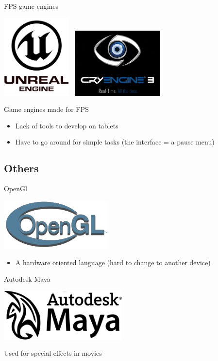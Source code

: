\documentclass[a4paper,10pt]{beamer}
\begin{document}
			\begin{frame}{FPS game engines}
				\centerline{\includegraphics[height=120pt]{images/logos/Unreal_Engine.png}  \mbox{     }\includegraphics[height=100pt]{images/logos/Cry_Engine.png}}
				
				Game engines made for FPS
				\begin{itemize}
					\item Lack of tools to develop on tablets
					\item Have to go around for simple tasks (the interface = a pause menu)
				\end{itemize}
			\end{frame}
			
			
		\subsection{Others}
		
			\begin{frame}{OpenGl}
				\centerline{\includegraphics[height=75pt]{images/logos/OpenGL_logo.png}}
				\begin{itemize}
					\item A hardware oriented language (hard to change to another device)
				\end{itemize}
			\end{frame}
			
			\begin{frame}{Autodesk Maya}
				\centerline{\includegraphics[height=75pt]{images/logos/Autodesk_Maya.png}}
				
				Used for special effects in movies
			\end{frame}
			
\end{document}
